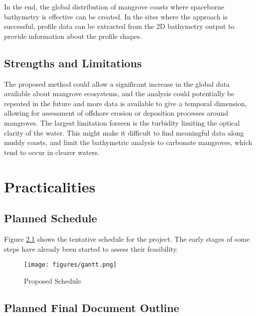 In the end, the global distribution of mangrove coasts where spaceborne bathymetry is effective can be created. In the sites where the approach is successful, profile data can be extracted from the 2D bathymetry output to provide information about the profile shapes.


\section{Strengths and Limitations}

The proposed method could allow a significant increase in the global data available about mangrove ecosystems, and the analysis could potentially be repeated in the future and more data is available to give a temporal dimension, allowing for assessment of offshore erosion or deposition processes around mangroves. The largest limitation forseen is the turbidity limiting the optical clarity of the water. This might make it difficult to find meaningful data along muddy coasts, and limit the bathymetric analysis to carbonate mangroves, which tend to occur in clearer waters.

\chapter{Practicalities}

\section{Planned Schedule}

Figure \ref{thesis-schedule} shows the tentative schedule for the project. The early stages of some steps have already been started to assess their feasibility.

\begin{landscape}
      \begin{figure}[htbp]
            \centering
            \texttt{[image: figures/gantt.png]}
            \caption{Proposed Schedule}
            \label{thesis-schedule}
      \end{figure}

\end{landscape}
\restoregeometry
\section{Planned Final Document Outline}

